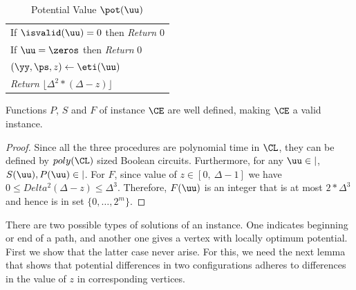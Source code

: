 \begin{table}[!htb]
\caption{Potential Value $\pot(\uu)$}\label{tab:F}
\begin{tabular}{|l|}
\hline
\hspace{5pt} If $\isvalid(\uu)=0$ then {\em Return} $0$\\
\hspace{5pt} If $\uu=\zeros$ then {\em Return} $0$\\
\hspace{5pt} $(\yy,\ps,z) \leftarrow \eti(\uu)$\\
\hspace{5pt} {\em Return} $\lfloor \Delta^2*(\Delta -z)\rfloor$\\
\hline
\end{tabular}
\end{table}

\begin{lemma}\label{lem:PSF}
Functions $P$, $S$ and $F$ of instance $\CE$ are well defined, making $\CE$ a valid \EOPL instance. 
\end{lemma}
\begin{proof}
Since all the three procedures are polynomial time in $\CL$, they can be defined by $poly(\CL)$ sized Boolean circuits. Furthermore, for any $\uu \in \vert$, $S(\uu),P(\uu) \in \vert$. For $F$, since value of $z \in [0,\ \Delta-1]$ we have $0\le Delta^2(\Delta-z)\le \Delta^3$. Therefore, $F(\uu)$ is an integer that is at most $2*\Delta^3$ and hence is in set $\{0,\dots, 2^m\}$. 
\end{proof}

There are two possible types of solutions of an \EOPL instance. One indicates beginning or end of a path, and another one gives a vertex with locally optimum potential. First we show that the latter case never arise. For this, we need the next lemma that shows that potential differences in two configurations adheres to differences in the value of $z$ in corresponding vertices.

